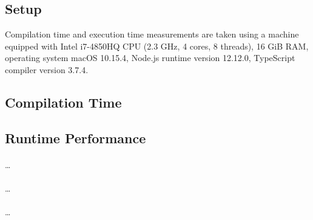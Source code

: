 \subsection{Setup}

Compilation time and execution time measurements 
are taken using a machine equipped with Intel i7-4850HQ CPU
(2.3 GHz, 4 cores, 8 threads), 16 GiB RAM, operating system macOS 10.15.4,
Node.js runtime version 12.12.0, TypeScript compiler version 3.7.4.

\subsection{Compilation Time}


\subsection{Runtime Performance}

\paragraph{}
\dots

\paragraph{}
\dots

\paragraph{}
\dots